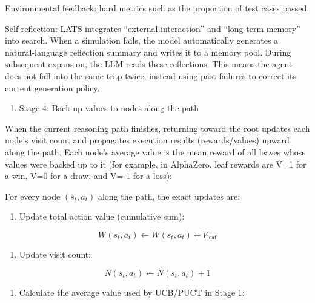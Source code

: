 Environmental feedback: hard metrics such as the proportion of test cases passed.

Self-reflection: LATS integrates ``external interaction'' and ``long-term memory'' into search. When a simulation fails, the model automatically generates a natural-language reflection summary and writes it to a memory pool. During subsequent expansion, the LLM reads these reflections. This means the agent does not fall into the same trap twice, instead using past failures to correct its current generation policy.

\begin{enumerate}
\def\labelenumi{(\arabic{enumi})}
\setcounter{enumi}{3}
\tightlist
\item
  Stage 4: Back up values to nodes along the path
\end{enumerate}

When the current reasoning path finishes, returning toward the root updates each node's visit count and propagates execution results (rewards/values) upward along the path. Each node's average value is the mean reward of all leaves whose values were backed up to it (for example, in AlphaZero, leaf rewards are V=1 for a win, V=0 for a draw, and V=-1 for a loss):

For every node \((s_t,a_t)\) along the path, the exact updates are:

\begin{enumerate}
\def\labelenumi{\arabic{enumi}.}
\tightlist
\item
{}
  Update total action value (cumulative sum):
\end{enumerate}

\[
W(s_t,a_t)\leftarrow W(s_t,a_t)+V_{\mathrm{leaf}}
\]

\begin{enumerate}
\def\labelenumi{\arabic{enumi}.}
\setcounter{enumi}{1}
\tightlist
\item
{}
  Update visit count:
\end{enumerate}

\[
N(s_t,a_t)\leftarrow N(s_t,a_t)+1
\]

\begin{enumerate}
\def\labelenumi{\arabic{enumi}.}
\setcounter{enumi}{2}
\tightlist
\item
{}
  Calculate the average value used by UCB/PUCT in Stage 1:
\end{enumerate}


